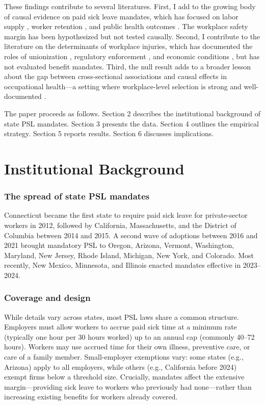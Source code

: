 \documentclass[12pt]{article}
\begin{document}
These findings contribute to several literatures. First, I add to the growing body of causal evidence on paid sick leave mandates, which has focused on labor supply \citep{pichler2020}, worker retention \citep{deangelis2023}, and public health outcomes \citep{stearns2015}. The workplace safety margin has been hypothesized \citep{asfaw2012, schultz2009} but not tested causally. Second, I contribute to the literature on the determinants of workplace injuries, which has documented the roles of unionization \citep{morantz2013}, regulatory enforcement \citep{levine2012}, and economic conditions \citep{boone2011}, but has not evaluated benefit mandates. Third, the null result adds to a broader lesson about the gap between cross-sectional associations and causal effects in occupational health---a setting where workplace-level selection is strong and well-documented \citep{leigh2011}.

The paper proceeds as follows. Section 2 describes the institutional background of state PSL mandates. Section 3 presents the data. Section 4 outlines the empirical strategy. Section 5 reports results. Section 6 discusses implications.


\section{Institutional Background}

\subsubsection*{The spread of state PSL mandates} Connecticut became the first state to require paid sick leave for private-sector workers in 2012, followed by California, Massachusetts, and the District of Columbia between 2014 and 2015. A second wave of adoptions between 2016 and 2021 brought mandatory PSL to Oregon, Arizona, Vermont, Washington, Maryland, New Jersey, Rhode Island, Michigan, New York, and Colorado. Most recently, New Mexico, Minnesota, and Illinois enacted mandates effective in 2023--2024.

\subsubsection*{Coverage and design} While details vary across states, most PSL laws share a common structure. Employers must allow workers to accrue paid sick time at a minimum rate (typically one hour per 30 hours worked) up to an annual cap (commonly 40--72 hours). Workers may use accrued time for their own illness, preventive care, or care of a family member. Small-employer exemptions vary: some states (e.g., Arizona) apply to all employers, while others (e.g., California before 2024) exempt firms below a threshold size. Crucially, mandates affect the extensive margin---providing sick leave to workers who previously had none---rather than increasing existing benefits for workers already covered.
\end{document}
